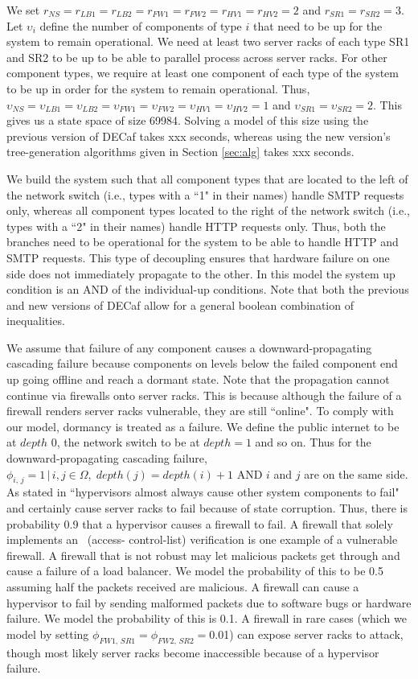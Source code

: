 \documentclass[12pt]{article}
\begin{document}
We set $r_{NS} = r_{LB1} = r_{LB2} = r_{FW1} = r_{FW2} = r_{HV1} = r_{HV2} =
2$ and $r_{SR1} = r_{SR2} = 3$. Let $\upsilon_i$ define the number of
components of type $i$ that need to be up for the system to remain
operational. We need at least two server racks of each type SR1 and SR2 to
be up to be able to parallel process across server racks. For other component
types, we require at least one component of each type of the system to be up in
order for the system to remain operational. Thus, $\upsilon_{NS} =
\upsilon_{LB1} = \upsilon_{LB2} = \upsilon_{FW1} = \upsilon_{FW2} =
\upsilon_{HV1} = \upsilon_{HV2} = 1$ and $\upsilon_{SR1} = \upsilon_{SR2} =
2$. This gives us a state space of size 69984. Solving a model of this size
using the previous version of DECaf takes xxx seconds, whereas using the new
version's tree-generation algorithms given in Section \ref{sec:alg} takes xxx
seconds.

We build the system such that all component types that are located to the left
of the network switch (i.e., types with a ``1" in their names) handle SMTP
requests only, whereas all component types located to the right of the network
switch (i.e., types with a ``2" in their names) handle HTTP requests only.
Thus, both the branches need to be operational for the system to be able to
handle HTTP and SMTP requests. This type of decoupling ensures that hardware
failure on one side does not immediately propagate to the other. In this model
the system up condition is an AND of the individual-up conditions. Note that
both the previous and new versions of DECaf allow for a general boolean
combination of inequalities.

We assume that failure of any component causes a downward-propagating
cascading failure because components on levels below the failed component end
up going offline and reach a dormant state. Note that the propagation cannot
continue via firewalls onto server racks. This is because although the failure
of a firewall renders server racks vulnerable, they are still ``online". To
comply with our model, dormancy is treated as a failure. We define the public
internet to be at $depth$ 0, the network switch to be at $depth = 1$ and so
on. Thus for the downward-propagating cascading failure, $\phi_{i,\,j} = 1 \,
| \, i, j \in \Omega, \; depth(j) = depth(i) + 1$ AND $i$ and $j$ are on the
same side. As stated in \cite{ReHype:2011} ``hypervisors almost always cause
other system components to fail" and certainly cause server racks to fail
because of state corruption. Thus, there is probability 0.9 that a hypervisor
causes a firewall to fail. A firewall that solely implements an ~(access-
control-list) verification is one example of a vulnerable firewall. A firewall
that is not robust may let malicious packets get through and cause a failure
of a load balancer. We model the probability of this to be 0.5 assuming half the
packets received are malicious. A firewall can cause a hypervisor to fail by
sending malformed packets due to software bugs or hardware failure. We model
the probability of this is 0.1. A firewall in rare cases (which we model by
setting $\phi_{FW1, \, SR1} = \phi_{FW2, \, SR2} = 0$.01) can expose server
racks to attack, though most likely server racks become inaccessible because
of a hypervisor failure. 
\end{document}
